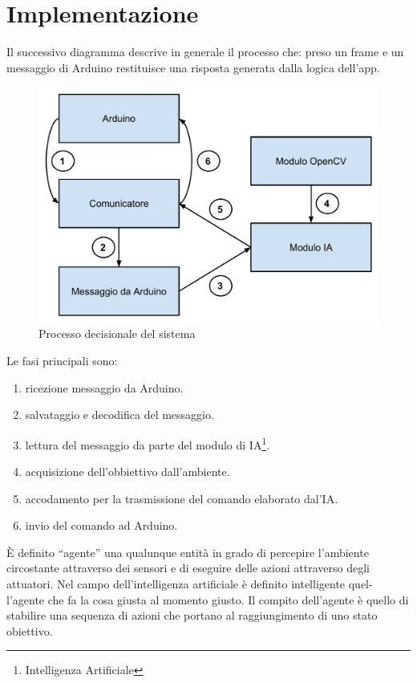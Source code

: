 \chapter{Implementazione}
\fancyfoot[C]{\thepage }
Il successivo diagramma descrive in generale il processo che: preso un frame e un messaggio
di Arduino restituisce una risposta generata dalla logica dell'app.
\begin{figure}[H] \center
\includegraphics[width=\textwidth]{immagini/schema_processo_new.pdf}
\caption{Processo decisionale del sistema} 
\end{figure}
Le fasi principali sono:
\begin{enumerate}
\item ricezione messaggio da Arduino.
\item salvataggio e decodifica del messaggio.
\item lettura del messaggio da parte del modulo di IA\footnote{Intelligenza Artificiale}.
\item acquisizione dell'obbiettivo dall'ambiente.
\item accodamento per la trasmissione del comando elaborato dal'IA.
\item invio del comando ad Arduino.
\end{enumerate}
È definito ``agente'' una qualunque entità in grado di percepire l'ambiente
circostante attraverso dei sensori e di eseguire delle azioni attraverso degli
attuatori. Nel campo dell'intelligenza artificiale è definito intelligente quel-
l'agente che fa la cosa giusta al momento giusto. Il compito dell'agente è
quello di stabilire una sequenza di azioni che portano al raggiungimento di
uno stato obiettivo.\cite{agente}

